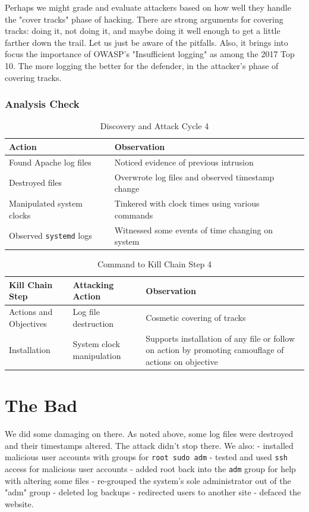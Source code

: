 Perhaps we might grade and evaluate attackers based on how well they handle the "cover tracks" phase of hacking.  There are strong arguments for covering tracks:  doing it, not doing it, and maybe doing it well enough to get a little farther down the trail.  Let us just be aware of the pitfalls.  Also, it brings into focus the importance of OWASP's "Insufficient logging" as among the 2017 Top 10.  The more logging the better for the defender, in the attacker's phase of covering tracks.

\subsubsection{Analysis Check}
\begin{table}[H]
\caption{Discovery and Attack Cycle 4}
\centering
\begin{tabular}{|l|l|}
\hline
Action & Observation \\
\hline
Found Apache log files & Noticed evidence of previous intrusion \\
Destroyed files & Overwrote log files and observed timestamp change \\
Manipulated system clocks & Tinkered with clock times using various commands \\
Observed \texttt{systemd} logs & Witnessed some events of time changing on system \\
\hline
\end{tabular}
\end{table}

\begin{table}[H]
\caption{Command to Kill Chain Step 4}
\centering
\begin{tabular}{|l|l|l|}
\hline
Kill Chain Step & Attacking Action & Observation \\
\hline
Actions and Objectives & Log file destruction & Cosmetic covering of tracks \\
Installation & System clock manipulation & Supports installation of any file or follow on action by promoting camouflage of actions on objective \\
\hline
\end{tabular}
\end{table}

\section{The Bad}
We did some damaging on there.  As noted above, some log files were destroyed and their timestamps altered.  The attack didn't stop there.  We also:
- installed malicious user accounts with groups for \texttt{root sudo adm}
- tested and used \texttt{ssh} access for malicious user accounts
- added root back into the \texttt{adm} group for help with altering some files
- re-grouped the system's sole administrator out of the "adm" group
- deleted log backups 
- redirected users to another site 
- defaced the website.  


